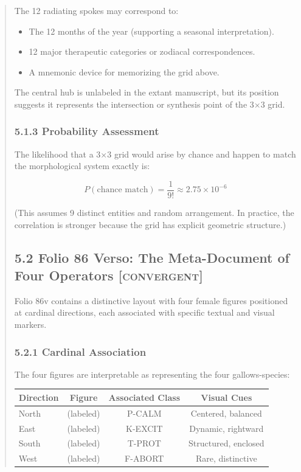 \documentclass[11pt,a4paper]{article}
\begin{document}
\begin{abstract}
The 12 radiating spokes may correspond to:
\begin{itemize}
\item The 12 months of the year (supporting a seasonal interpretation).
\item 12 major therapeutic categories or zodiacal correspondences.
\item A mnemonic device for memorizing the grid above.
\end{itemize}

The central hub is unlabeled in the extant manuscript, but its position suggests it represents the intersection or synthesis point of the 3×3 grid.

\subsubsection*{5.1.3 Probability Assessment}

The likelihood that a 3×3 grid would arise by chance and happen to match the morphological system exactly is:

\begin{equation}
P(\text{chance match}) = \frac{1}{9!} \approx 2.75 \times 10^{-6}
\end{equation}

(This assumes 9 distinct entities and random arrangement. In practice, the correlation is stronger because the grid has explicit geometric structure.)

\subsection*{5.2 Folio 86 Verso: The Meta-Document of Four Operators \textsc{[convergent]}}

Folio 86v contains a distinctive layout with four female figures positioned at cardinal directions, each associated with specific textual and visual markers.

\subsubsection*{5.2.1 Cardinal Association}

The four figures are interpretable as representing the four gallows-species:

\begin{center}
\begin{tabular}{lccc}
\hline
\textbf{Direction} & \textbf{Figure} & \textbf{Associated Class} & \textbf{Visual Cues} \\
\hline
North & (labeled) & P-CALM & Centered, balanced \\
East & (labeled) & K-EXCIT & Dynamic, rightward \\
South & (labeled) & T-PROT & Structured, enclosed \\
West & (labeled) & F-ABORT & Rare, distinctive \\
\hline
\end{tabular}
\end{center}


\end{abstract}
\end{document}
